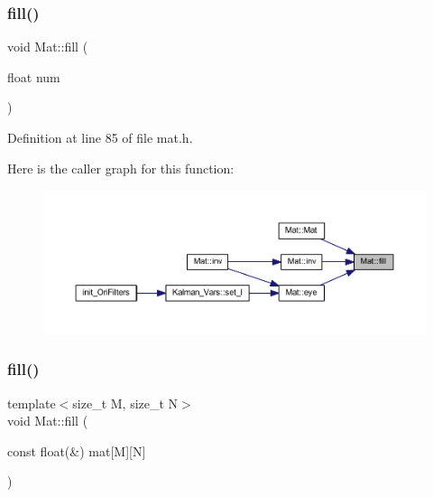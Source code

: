\subsubsection{\texorpdfstring{fill()}{fill()}\hspace{0.1cm}{\footnotesize\ttfamily [1/2]}}
{\footnotesize\ttfamily void Mat\+::fill (\begin{DoxyParamCaption}\item[{float}]{num }\end{DoxyParamCaption})\hspace{0.3cm}{\ttfamily [inline]}}



Definition at line 85 of file mat.\+h.

Here is the caller graph for this function\+:
\nopagebreak
\begin{figure}[H]
\begin{center}
\leavevmode
\includegraphics[width=350pt]{class_mat_abadfedd9dc62cb060771a03ac40c7340_icgraph}
\end{center}
\end{figure}
\mbox{\label{class_mat_af95f54284a8d4937918dadb347e76a13}} 
\subsubsection{\texorpdfstring{fill()}{fill()}\hspace{0.1cm}{\footnotesize\ttfamily [2/2]}}
{\footnotesize\ttfamily template$<$size\+\_\+t M, size\+\_\+t N$>$ \\
void Mat\+::fill (\begin{DoxyParamCaption}\item[{const float(\&)}]{mat\mbox{[}\+M\mbox{]}\mbox{[}\+N\mbox{]} }\end{DoxyParamCaption})\hspace{0.3cm}{\ttfamily [inline]}}




